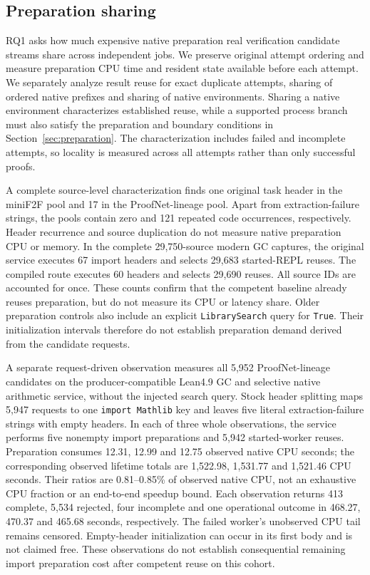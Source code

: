 \documentclass[10pt,twocolumn]{article}
\begin{document}
\subsection{Preparation sharing}\label{sec:opportunity}
RQ1 asks how much expensive native preparation real verification candidate streams share across independent jobs. We preserve original attempt ordering and measure preparation CPU time and resident state available before each attempt. We separately analyze result reuse for exact duplicate attempts, sharing of ordered native prefixes and sharing of native environments. Sharing a native environment characterizes established reuse, while a supported process branch must also satisfy the preparation and boundary conditions in Section~\ref{sec:preparation}. The characterization includes failed and incomplete attempts, so locality is measured across all attempts rather than only successful proofs.

A complete source-level characterization finds one original task header in
the miniF2F pool and 17 in the ProofNet-lineage pool. Apart from extraction-failure
strings, the pools contain zero and 121 repeated code occurrences, respectively.
Header recurrence and source duplication do not measure native preparation
CPU or memory. In the complete 29,750-source modern GC captures, the original
service executes 67 import headers and selects 29,683 started-REPL reuses.
The compiled route executes 60 headers and selects 29,690 reuses. All source
IDs are accounted for once. These counts confirm that the competent baseline
already reuses preparation, but do not measure its CPU or latency share.
Older preparation controls also include an explicit
\texttt{LibrarySearch} query for \texttt{True}. Their initialization intervals
therefore do not establish preparation demand derived from the candidate
requests.

A separate request-driven observation measures all 5,952 ProofNet-lineage
candidates on the producer-compatible Lean4.9 GC and selective native
arithmetic service, without the injected search query. Stock header splitting
maps 5,947 requests to one \texttt{import Mathlib} key and leaves five literal
extraction-failure strings with empty headers. In each of three whole
observations, the service performs five nonempty import preparations and
5,942 started-worker reuses. Preparation consumes 12.31, 12.99 and 12.75
observed native CPU seconds; the corresponding observed lifetime totals are
1,522.98, 1,531.77 and 1,521.46 CPU seconds. Their ratios are 0.81--0.85\%
of observed native CPU, not an exhaustive CPU fraction or an end-to-end
speedup bound. Each observation returns 413 complete, 5,534 rejected, four
incomplete and one operational outcome in 468.27, 470.37 and 465.68 seconds,
respectively. The failed worker's unobserved CPU tail remains censored.
Empty-header initialization can occur in its first body and is not claimed
free. These observations do not establish consequential remaining import
preparation cost after competent reuse on this cohort.
\end{document}
